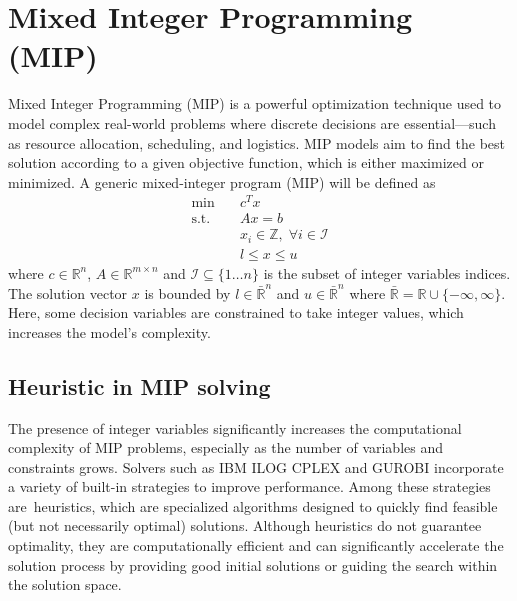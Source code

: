 \section{Mixed Integer Programming (MIP)}
Mixed Integer Programming (MIP) is a powerful optimization technique used to model complex real-world problems where discrete decisions are essential—such as resource allocation, scheduling, and logistics.
MIP models aim to find the best solution according to a given objective function, which is either maximized or minimized.
A generic mixed-integer program (MIP) will be defined as
\begin{align*}
\text{min} \quad & c^T x \\
\text{s.t.} \quad & Ax = b \\
                        & x_i \in \mathbb{Z},\; \forall i \in \mathcal{I} \\
                        & l \le x \le u
\end{align*}
where $c \in \mathbb{R}^n$, $A \in \mathbb{R}^{m \times n}$ and $\mathcal{I}\subseteq\{1\dots n\}$ is the subset of integer variables indices. The solution vector $x$ is bounded by $l \in \bar{\mathbb{R}}^n$ and $u \in \bar{\mathbb{R}}^n$ where $\bar{\mathbb{R}}= \mathbb{R} \cup \{-\infty,\infty\}$.
Here, some decision variables are constrained to take integer values, which increases the model’s complexity.
\subsection{Heuristic in MIP solving}
The presence of integer variables significantly increases the computational complexity of MIP problems, especially as the number of variables and constraints grows. Solvers such as IBM ILOG CPLEX\cite{cplex} and GUROBI\cite{gurobi} incorporate a variety of built-in strategies to improve performance. Among these strategies are heuristics, which are specialized algorithms designed to quickly find feasible (but not necessarily optimal) solutions. Although heuristics do not guarantee optimality, they are computationally efficient and can significantly accelerate the solution 
process by providing good initial solutions or guiding the search within the solution space.

